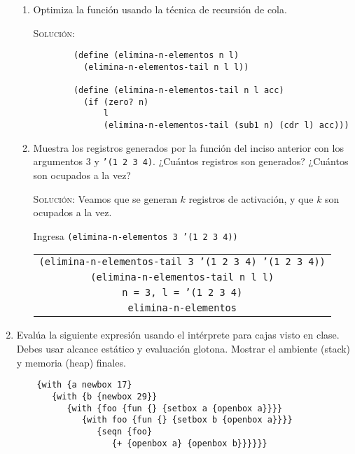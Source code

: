 \documentclass[letterpaper,11pt]{article}
\begin{document}
\begin{enumerate}
\begin{enumerate}
        \item Optimiza la función usando la técnica de recursión de cola.
        
        \textsc{Solución:}
        \begin{verbatim}
        (define (elimina-n-elementos n l)
          (elimina-n-elementos-tail n l l))
          
        (define (elimina-n-elementos-tail n l acc)
          (if (zero? n)
              l
              (elimina-n-elementos-tail (sub1 n) (cdr l) acc)))
        \end{verbatim}

        \item Muestra los registros generados por la función del inciso anterior
        con los argumentos $3$ y \texttt{'(1 2 3 4)}. ¿Cuántos registros son 
        generados? ¿Cuántos son ocupados a la vez?

        \textsc{Solución:} Veamos que se generan $k$ registros de activación, y 
        que $k$ son ocupados a la vez.

        Ingresa \texttt{(elimina-n-elementos 3 '(1 2 3 4))}
        \begin{center}
            \begin{tabular}[h]{|c|}
                \hline
                \texttt{(elimina-n-elementos-tail 3 '(1 2 3 4) '(1 2 3 4))} \\
                \texttt{(elimina-n-elementos-tail n l l)} \\
                \texttt{n = 3, l = '(1 2 3 4)} \\
                \texttt{elimina-n-elementos} \\
                \hline
            \end{tabular}
        \end{center}
    \end{enumerate}

    \item Evalúa la siguiente expresión usando el intérprete para cajas visto 
    en clase. Debes usar alcance estático y evaluación glotona. Mostrar el 
    ambiente (stack) y memoria (heap) finales.
    \begin{verbatim}
    {with {a newbox 17}
       {with {b {newbox 29}}
          {with {foo {fun {} {setbox a {openbox a}}}}
             {with foo {fun {} {setbox b {openbox a}}}}
                {seqn {foo}
                   {+ {openbox a} {openbox b}}}}}}
    \end{verbatim}


\end{enumerate}
\end{document}
